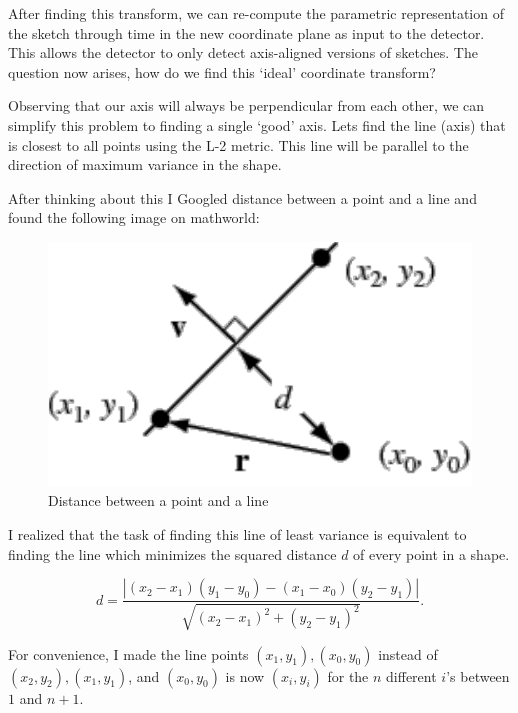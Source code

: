 \documentclass{article}
\begin{document}
After finding this transform, we can re-compute the parametric representation of the sketch through time in the new coordinate plane as input to the detector. This allows the detector to only detect axis-aligned versions of sketches. The question now arises, how do we find this `ideal' coordinate transform? 

Observing that our axis will always be perpendicular from each other, we can simplify this problem to finding a single `good' axis. Lets find the line (axis) that is closest to all points using the L-2 metric. This line will be parallel to the direction of maximum variance in the shape. 

After thinking about this I Googled distance between a point and a line and found the following image on mathworld:

\begin{figure}[htbp]
\begin{center}
\includegraphics[scale=.5]{pointline}
\caption{Distance between a point and a line}
\label{ex2}
\end{center}
\end{figure}

I realized that the task of finding this line of least variance is equivalent to finding the line which minimizes the squared distance $d$ of every point in a shape.

$$ d = \frac{|(x_2 - x_1)(y_1 - y_0) - (x_1 - x_0)(y_2 - y_1)|}{\sqrt{(x_2 - x_1)^2 + (y_2 - y_1)^2}}.$$

For convenience, I made the line points $(x_1,y_1), (x_0,y_0)$ instead of $(x_2,y_2), (x_1,y_1)$, and $(x_0,y_0)$ is now $(x_i, y_i)$ for the $n$ different $i$'s between $1$ and $n + 1$.
\end{document}
